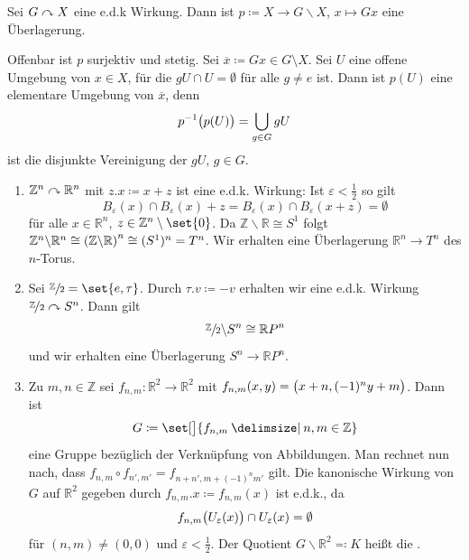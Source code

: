\begin{lemma}[{name=[Überlagerung aus e.d.k. Wirkung]}]
	Sei $G \action X$ eine e.d.k Wirkung. 
	Dann ist $p \coloneqq X \to G \backslash X$, $x \mapsto Gx$ eine Überlagerung.
\end{lemma}
\begin{beweis}
	Offenbar ist $p$ surjektiv und stetig. 
	Sei $\overline{x} \coloneqq G x \in G \setminus X$. 
	Sei $U$ eine offene Umgebung von $x \in X$, für die $g U \cap U = \emptyset$ für alle $g \not= e$ ist. 
	Dann ist $p(U)$ eine elementare Umgebung von $\overline{x}$, denn 
	\[
		p ^{-1} \enbrace[\big]{p(U)} = \bigcup_{g \in G} g U
	\]
	ist die disjunkte Vereinigung der $g U$, $g \in G$.
\end{beweis}

\begin{beispiel}[{name=[eigentlich diskontinuierliche Wirkungen]}]
	\begin{enumerate}[(1)]
		\item $\mathbb{Z}^n \action \mathbb{R}^n$ mit $z . x \coloneqq x + z$ ist eine e.d.k. Wirkung: Ist $\varepsilon < \frac{1}{2}$ so gilt 
		\[
			B_\varepsilon(x) \cap B_\varepsilon(x) + z = B_\varepsilon(x) \cap B_\varepsilon(x +z) = \emptyset
		\]
		für alle $x \in \mathbb{R}^n$, $z \in \mathbb{Z}^n \setminus \set{0}$. 
		Da $\mathbb{Z} \backslash \mathbb{R} \cong S^1$ folgt $\mathbb{Z}^n \backslash \mathbb{R}^n \cong \enbrace*{\mathbb{Z} \backslash \mathbb{R}}^n \cong (S^1)^n = T^n $. 
		Wir erhalten eine Überlagerung $\mathbb{R}^n \to T^n$ des $n$-Torus.
		\item Sei $\sfrac{\mathbb{Z}}{2} = \set{e, \tau}$. 
		Durch $\tau . v \coloneqq - v$ erhalten wir eine e.d.k. Wirkung $\nicefrac{\mathbb{Z}}{2} \action S^n$. 
		Dann gilt
		\[
			\sfrac{\mathbb{Z}}{2} \backslash S^n \cong \mathbb{R}P^n
		\]
		und wir erhalten eine Überlagerung $S^n \to \mathbb{R}P^n$. 
		\item Zu $m,n \in \mathbb{Z}$ sei $f_{n,m} \colon \mathbb{R}^2 \to \mathbb{R}^2$ mit $f_{n,m} (x,y) = \enbrace[\big]{x + n, (-1)^n y + m}$. Dann ist 
		\[
			G \coloneqq \set[\big]{f_{n,m} \given n,m \in \mathbb{Z}} 
		\]
		eine Gruppe bezüglich der Verknüpfung von Abbildungen. 
		Man rechnet nun nach, dass $f_{n,m} \circ f_{n',m'} = f_{n+n', m+ (-1)^n m'}$ gilt. 
		Die kanonische Wirkung von $G$ auf $\mathbb{R}^2$ gegeben durch $f_{n,m} . x \coloneqq f_{n,m}(x)$ ist e.d.k., da 
		\[
			f_{n,m} \enbrace[\big]{U_\varepsilon(x)} \cap U_\varepsilon(x) = \emptyset  
		\]
		für $(n,m) \neq (0,0)$ und $\varepsilon < \frac{1}{2}$. 
		Der Quotient $G\backslash \mathbb{R}^2 \eqqcolon K$ heißt die . 

\end{enumerate}
\end{beispiel}
